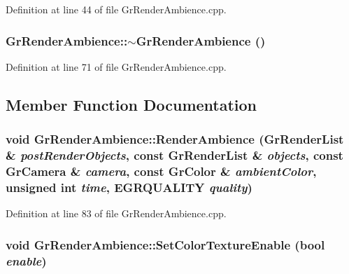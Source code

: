 Definition at line 44 of file GrRenderAmbience.cpp.\hypertarget{class_gr_render_ambience_5124e81699393a42aa18f64b784121cc}{
\subsubsection[{$\sim$GrRenderAmbience}]{\setlength{\rightskip}{0pt plus 5cm}GrRenderAmbience::$\sim$GrRenderAmbience ()}}
\label{class_gr_render_ambience_5124e81699393a42aa18f64b784121cc}




Definition at line 71 of file GrRenderAmbience.cpp.

\subsection{Member Function Documentation}
\hypertarget{class_gr_render_ambience_86bed7518d863b549ea73ae06025f929}{
\subsubsection[{RenderAmbience}]{\setlength{\rightskip}{0pt plus 5cm}void GrRenderAmbience::RenderAmbience ({\bf GrRenderList} \& {\em postRenderObjects}, \/  const {\bf GrRenderList} \& {\em objects}, \/  const {\bf GrCamera} \& {\em camera}, \/  const {\bf GrColor} \& {\em ambientColor}, \/  unsigned int {\em time}, \/  {\bf EGRQUALITY} {\em quality})}}
\label{class_gr_render_ambience_86bed7518d863b549ea73ae06025f929}




Definition at line 83 of file GrRenderAmbience.cpp.\hypertarget{class_gr_render_ambience_ab79d93102ccc766970a4496ee89e48c}{
\subsubsection[{SetColorTextureEnable}]{\setlength{\rightskip}{0pt plus 5cm}void GrRenderAmbience::SetColorTextureEnable (bool {\em enable})}}
\label{class_gr_render_ambience_ab79d93102ccc766970a4496ee89e48c}




